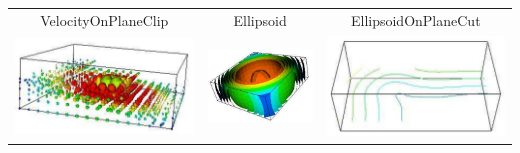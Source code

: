 \begin{table}[ht]
\begin{tabular}{c c c}
VelocityOnPlaneClip & Ellipsoid & EllipsoidOnPlaneCut \\
\includegraphics[width=\thumbnailwidth]{figures/EllipsoidOnPlaneClip} & 
\includegraphics[width=\thumbnailwidth]{figures/Contour} & 
\includegraphics[width=\thumbnailwidth]{figures/ContourOnPlaneCut}  \\

\end{tabular}
\end{table}

